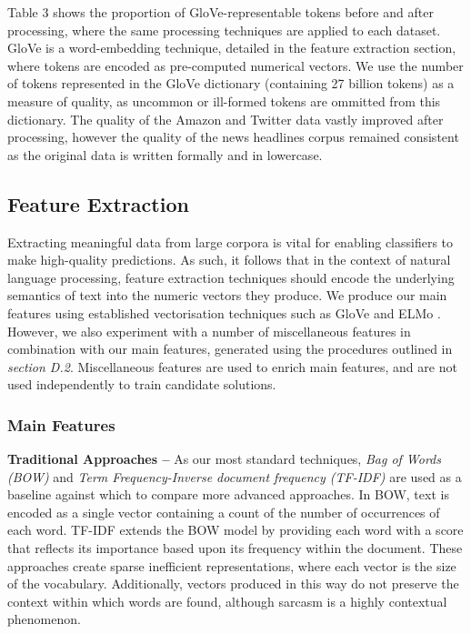 \documentclass[12pt,a4paper]{article}
\begin{document}
\noindent Table 3 shows the proportion of GloVe-representable tokens before and after processing, where the same processing techniques are applied to each dataset. GloVe is a word-embedding technique, detailed in the feature extraction section, where tokens are encoded as pre-computed numerical vectors. We use the number of tokens represented in the GloVe dictionary (containing 27 billion tokens) as a measure of quality, as uncommon or ill-formed tokens are ommitted from this dictionary. The quality of the Amazon and Twitter data vastly improved after processing, however the quality of the news headlines corpus remained consistent as the original data is written formally and in lowercase.



\subsection{Feature Extraction}
\vspace{-4.2pt}
\noindent Extracting meaningful data from large corpora is vital for enabling classifiers to make high-quality predictions. As such, it follows that in the context of natural language processing, feature extraction techniques should encode the underlying semantics of text into the numeric vectors they produce. We produce our main features using established vectorisation techniques such as GloVe \cite{pennington2014glove} and ELMo \cite{peters2018deep}. However, we also experiment with a number of miscellaneous features in combination with our main features, generated using the procedures outlined in \textit{section D.2}. Miscellaneous features are used to enrich main features, and are not used independently to train candidate solutions.\vspace{-4.2pt}

\subsubsection{Main Features}
\noindent \textbf{Traditional Approaches --} As our most standard techniques, \textit{Bag of Words (BOW)} and \textit{Term Frequency-Inverse document frequency (TF-IDF)} \cite{robertson1976relevance} are used as a baseline against which to compare more advanced approaches. In BOW, text is encoded as a single vector containing a count of the number of occurrences of each word. TF-IDF extends the BOW model by providing each word with a score that reflects its importance based upon its frequency within the document. These approaches create sparse inefficient representations, where each vector is the size of the vocabulary. Additionally, vectors produced in this way do not preserve the context within which words are found, although sarcasm is a highly contextual phenomenon.\\
\end{document}
